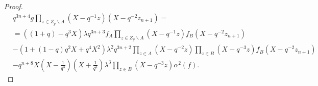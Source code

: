 \documentclass[a4paper, 11pt]{article}
\theoremstyle{definition}
\begin{document}
\begin{proof}






\begin{equation}\label{***}
\begin{split}
&q^{3n+4}g \prod_{z\in Z_g\backslash A}(X-q^{-1}z)(X-q^{-2}z_{n+1})=\\
&=\left((1+q)-q^3X\right)\lambda q^{3n+3}f_A\prod_{z\in Z_g\backslash A}(X-q^{-1}z)f_B(X-q^{-2}z_{n+1})\\
&-\left(1+(1-q)q^2X+q^4X^2\right)\lambda^2q^{3n+2}\prod_{z\in A}(X-q^{-2}z)\prod_{z\in B}(X-q^{-3}z)f_B(X-q^{-2}z_{n+1})\\
&-q^{n+8}X(X-\frac{1}{q^3})(X+\frac{1}{q^3})\lambda^3\prod_{z\in B}(X-q^{-3}z)\alpha^2(f).
\end{split}
\end{equation}



\end{proof}
\end{document}

